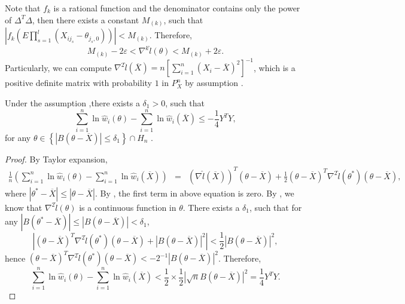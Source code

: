 Note that $f_{k}$ is a rational function and the denominator contains
only the power of $\Delta^{T}\Delta$, then there exists a constant
$M_{\left(k\right)}$, such that $\left|f_{k}\left(E\prod_{s=1}^{l}\left(X_{ij_{s}}-\theta_{j_{s},0}\right)\right)\right|<M_{\left(k\right)}.$
Therefore, 
\[
M_{\left(k\right)}-2\varepsilon<\nabla^{k}\hat{l}\left(\theta\right)<M_{\left(k\right)}+2\varepsilon.
\]
Particularly, we can compute $\nabla^{2}\hat{l}\left(\overline{X}\right)=n\left[\sum_{i=1}^{n}\left(X_{i}-\overline{X}\right)^{2}\right]^{-1}$,
which is a positive definite matrix with probability $1$ in $P_{X}^{n}$
by assumption  . 
\begin{lem}
\label{lem:near-mean-2nd-order-bound}Under the assumption ,there
exists a $\delta_{1}>0$, such that 
\[
\sum_{i=1}^{n}\ln\hat{w}_{i}\left(\theta\right)-\sum_{i=1}^{n}\ln\hat{w}_{i}\left(\overline{X}\right)\le-\frac{1}{4}Y^{T}Y,
\]
for any $\theta\in\left\{ \left|B\left(\theta-\overline{X}\right)\right|\le\delta_{1}\right\} \cap H_{n}$
. \end{lem}
\begin{proof}
By Taylor expansion, 
\begin{eqnarray*}
\frac{1}{n}\left(\sum_{i=1}^{n}\ln\hat{w}_{i}\left(\theta\right)-\sum_{i=1}^{n}\ln\hat{w}_{i}\left(\overline{X}\right)\right) & = & \left(\nabla\hat{l}\left(\overline{X}\right)\right)^{T}\left(\theta-\overline{X}\right)+\frac{1}{2}\left(\theta-\overline{X}\right)^{T}\nabla^{2}\hat{l}\left(\theta^{*}\right)\left(\theta-\overline{X}\right),
\end{eqnarray*}
where $\left|\theta^{*}-\overline{X}\right|\le\left|\theta-\overline{X}\right|$.
By , the first term in above equation is zero.
By , we know that $\nabla^{2}\hat{l}\left(\theta\right)$
is a continuous function in $\theta$. There exists a $\delta_{1}$,
such that for any $\left|B\left(\theta^{*}-\overline{X}\right)\right|\le\left|B\left(\theta-\overline{X}\right)\right|<\delta_{1}$,
\[
\left|\left(\theta-\overline{X}\right)^{T}\nabla^{2}\hat{l}\left(\theta^{*}\right)\left(\theta-\overline{X}\right)+\left|B\left(\theta-\overline{X}\right)\right|^{2}\right|<\frac{1}{2}\left|B\left(\theta-\overline{X}\right)\right|^{2},
\]
hence $\left(\theta-\overline{X}\right)^{T}\nabla^{2}\hat{l}\left(\theta^{*}\right)\left(\theta-\overline{X}\right)<-2^{-1}\left|B\left(\theta-\overline{X}\right)\right|^{2}$.
Therefore, 
\[
\sum_{i=1}^{n}\ln\hat{w}_{i}\left(\theta\right)-\sum_{i=1}^{n}\ln\hat{w}_{i}\left(\overline{X}\right)<\frac{1}{2}\times\frac{1}{2}\left|\sqrt{n}B\left(\theta-\overline{X}\right)\right|^{2}=\frac{1}{4}Y^{T}Y.
\]

\end{proof}

